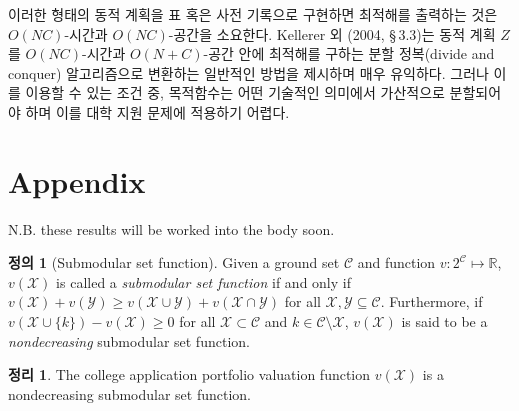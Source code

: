\documentclass[11pt]{article} %
\newtheorem{theorem}{Theorem}
\theoremstyle{definition}
\newtheorem{definition}{Definition}
\newtheorem{theorem}{정리}
\theoremstyle{definition}
\newtheorem{definition}{정의}
\begin{document}
이러한 형태의 동적 계획을 표 혹은 사전 기록으로 구현하면 최적해를 출력하는 것은 $O(NC)$-시간과 $O(NC)$-공간을 소요한다. Kellerer 외 (2004, \S\,3.3)는 동적 계획 $Z$를 $O(N C)$-시간과 $O(N + C)$-공간 안에 최적해를 구하는 분할 정복(divide and conquer) 알고리즘으로 변환하는 일반적인 방법을 제시하며 매우 유익하다. 그러나 이를 이용할 수 있는 조건 중, 목적함수는 어떤 기술적인 의미에서 가산적으로 분할되어야 하며 이를 대학 지원 문제에 적용하기 어렵다.
\fi


\section{Appendix}

N.B. these results will be worked into the body soon.

\begin{definition}[Submodular set function]
Given a ground set $\mathcal{C}$ and function $v : 2^{\mathcal{C}} \mapsto \mathbb{R}$, $v(\mathcal{X})$ is called a \emph{submodular set function} if and only if $v(\mathcal{X}) + v(\mathcal{Y}) \geq v(\mathcal{X}\cup\mathcal{Y}) + v(\mathcal{X}\cap\mathcal{Y})$
for all $\mathcal{X}, \mathcal{Y} \subseteq \mathcal{C}$. Furthermore, if $ v(\mathcal{X}\cup\{k\}) - v(\mathcal{X}) \geq 0$ for all $\mathcal{X} \subset \mathcal{C}$ and $k \in \mathcal{C} \setminus \mathcal{X}$, $v(\mathcal{X})$ is said to be a \emph{nondecreasing} submodular set function.
\end{definition}

\begin{theorem}
The college application portfolio valuation function
$v(\mathcal{X})$ %
is a nondecreasing submodular set function.
\end{theorem}
\end{document}
